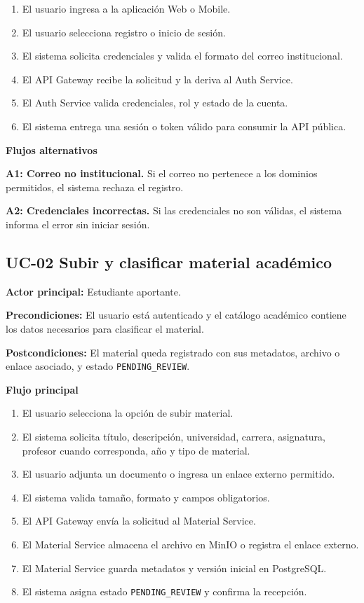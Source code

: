 \documentclass[12pt,a4paper]{article}
\begin{document}
\begin{enumerate}
    \item El usuario ingresa a la aplicación Web o Mobile.
    \item El usuario selecciona registro o inicio de sesión.
    \item El sistema solicita credenciales y valida el formato del correo institucional.
    \item El API Gateway recibe la solicitud y la deriva al Auth Service.
    \item El Auth Service valida credenciales, rol y estado de la cuenta.
    \item El sistema entrega una sesión o token válido para consumir la API pública.
\end{enumerate}

\noindent\textbf{Flujos alternativos}

\noindent\textbf{A1: Correo no institucional.} Si el correo no pertenece a los dominios permitidos, el sistema rechaza el registro.

\noindent\textbf{A2: Credenciales incorrectas.} Si las credenciales no son válidas, el sistema informa el error sin iniciar sesión.

\subsection{UC-02 Subir y clasificar material académico}

\noindent\textbf{Actor principal:} Estudiante aportante.

\noindent\textbf{Precondiciones:} El usuario está autenticado y el catálogo académico contiene los datos necesarios para clasificar el material.

\noindent\textbf{Postcondiciones:} El material queda registrado con sus metadatos, archivo o enlace asociado, y estado \texttt{PENDING\_REVIEW}.

\noindent\textbf{Flujo principal}

\begin{enumerate}
    \item El usuario selecciona la opción de subir material.
    \item El sistema solicita título, descripción, universidad, carrera, asignatura, profesor cuando corresponda, año y tipo de material.
    \item El usuario adjunta un documento o ingresa un enlace externo permitido.
    \item El sistema valida tamaño, formato y campos obligatorios.
    \item El API Gateway envía la solicitud al Material Service.
    \item El Material Service almacena el archivo en MinIO o registra el enlace externo.
    \item El Material Service guarda metadatos y versión inicial en PostgreSQL.
    \item El sistema asigna estado \texttt{PENDING\_REVIEW} y confirma la recepción.
\end{enumerate}
\end{document}
